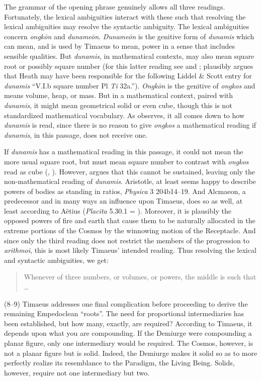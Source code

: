 The grammar of the opening phrase genuinely allows all three readings. Fortunately, the lexical ambiguities interact with these such that resolving the lexical ambiguities may resolve the syntactic ambiguity. The lexical ambiguities concern \emph{ongkōn} and \emph{dunameōn}. \emph{Dunameōn} is the genitive form of \emph{dunamis} which can mean, and is used by Timaeus to mean, power in a sense that includes sensible qualities. But \emph{dunamis}, in mathematical contexts, may also mean square root or possibly square number (for this latter reading see \citealt[97 n12]{Archer-Hind:1888qd} and \citealt[294 n1]{Heath:1921ys}; \citealt[184]{Prtichard:1990aa} plausibly argues that Heath may have been responsible for the following Liddel \& Scott entry for \emph{dunamis} ``V.I.b square number Pl \emph{Ti} 32a.''). \emph{Ongkōn} is the genitive of \emph{ongkos} and means volume, heap, or mass. But in a mathematical context, paired with \emph{dunamis}, it might mean geometrical solid or even cube, though this is not standardized mathematical vocabulary. As \citet{Prtichard:1990aa} observes, it all comes down to how \emph{dunamis} is read, since there is no reason to give \emph{ongkos} a mathematical reading if \emph{dunamis}, in this passage, does not receive one. 

If \emph{dunamis} has a mathematical reading in this passage, it could not mean the more usual square root, but must mean square number to contrast with \emph{ongkos} read as cube (\citealt[97 n12]{Archer-Hind:1888qd}, \citealt[45--52]{Cornford:1935fk}). However, \citet{Prtichard:1990aa} argues that this cannot be sustained, leaving only the non-mathematical reading of \emph{dunamis}. Aristotle, at least seems happy to describe powers of bodies as standing in ratios, \emph{Physica} 3 204b14--19. And Alcmaeon, a predecessor and in many ways an influence upon Timaeus, does so as well, at least according to Aëtius (\emph{Placita} 5.30.1 = ). Moreover, it is plausibly the opposed powers of fire and earth that cause them to be naturally allocated in the extreme portions of the Cosmos by the winnowing motion of the Receptacle. And since only the third reading does not restrict the members of the progression to \emph{arithmoi}, this is most likely Timaeus' intended reading. Thus resolving the lexical and syntactic ambiguities, we get:
\begin{quote}
	Whenever of three numbers, or volumes, or powers, the middle is such that \dots
\end{quote}

(8--9) Timaeus addresses one final complication before proceeding to derive the remaining Empedoclean ``roots''. The need for proportional intermediaries has been established, but how many, exactly, are required? According to Timaeus, it depends upon what you are compounding. If the Demiurge were compounding a planar figure, only one intermediary would be required. The Cosmos, however, is not a planar figure but is solid. Indeed, the Demiurge makes it solid so as to more perfectly realize its resemblance to the Paradigm, the Living Being. Solids, however, require not one intermediary but two. 

